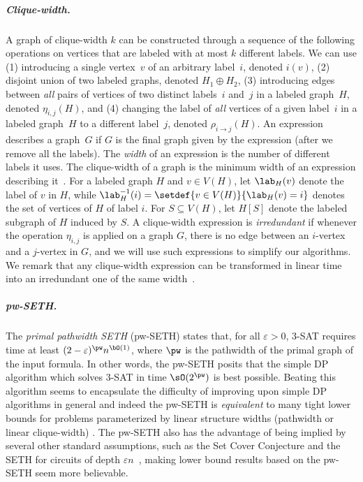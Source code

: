 \subparagraph{Clique-width.}
A graph of clique-width $k$ can be constructed through a sequence of the following operations on vertices that are labeled with at most $k$ different labels.
We can use (1) introducing a single vertex~$v$ of an arbitrary label~$i$, denoted $i(v)$,
(2) disjoint union of two labeled graphs, denoted $H_1 \oplus H_2$,
(3) introducing edges between \emph{all} pairs of vertices of two distinct labels~$i$ and~$j$ in a labeled graph~$H$, denoted $\eta_{i,j}(H)$,
and (4) changing the label of \emph{all} vertices of a given label~$i$ in a labeled graph~$H$ to a different label~$j$,
denoted $\rho_{i \to j}(H)$.
An expression describes a graph~$G$ if $G$ is the final graph given by the expression (after we remove all the labels).
The \emph{width} of an expression is the number of different labels it uses.
The clique-width of a graph is the minimum width of an expression describing it~\cite{dam/CourcelleO00}.
For a labeled graph $H$ and $v \in V(H)$, let $\lab_H(v)$ denote the label of $v$ in $H$,
while $\lab^{-1}_H (i) = \setdef{v \in V(H)}{\lab_H(v) = i}$ denotes the set of vertices of $H$ of label $i$.
For $S \subseteq V(H)$, let $H[S]$ denote the labeled subgraph of $H$ induced by $S$.
A clique-width expression is \emph{irredundant} if whenever the operation $\eta_{i,j}$
is applied on a graph $G$, there is no edge between an $i$-vertex and a $j$-vertex in $G$,
and we will use such expressions to simplify our algorithms.
We remark that any clique-width expression can be transformed in linear time into an irredundant one of the same width~\cite{dam/CourcelleO00}.

\subparagraph{pw-SETH.} The \emph{primal pathwidth SETH} (pw-SETH) states that,
for all $\varepsilon>0$, 3-SAT requires time at least
$(2-\varepsilon)^{\pw}n^{\bO(1)}$, where $\pw$ is the pathwidth of the primal
graph of the input formula. In other words, the pw-SETH posits that the simple
DP algorithm which solves 3-SAT in time $\sO(2^{\pw})$ is best possible.
Beating this algorithm seems to encapsulate the difficulty of improving upon
simple DP algorithms in general and indeed the pw-SETH is \emph{equivalent} to
many tight lower bounds for problems parameterized by linear structure widths
(pathwidth or linear clique-width) \cite{soda/Lampis25}. The pw-SETH also has
the advantage of being implied by several other standard assumptions, such as the
Set Cover Conjecture and the SETH for circuits of depth $\varepsilon n$~\cite{arxiv/Lampis24},
making lower bound results based on the pw-SETH seem more believable.

